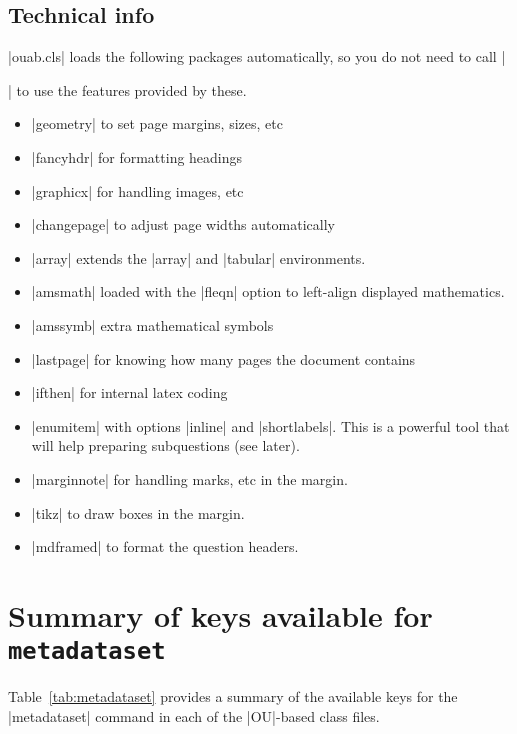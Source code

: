 \documentclass[a4paper]{ltxguide}
\newcommand\3{\unskip\enspace\fbox{\fontsize{4}{4}\selectfont NEW 3.0}}
\begin{document}
\subsection{Technical info}

|ouab.cls| loads the following packages automatically, so you do not need to call |\usepackage{...}| to use the features provided by these.

\begin{itemize}
\item |geometry| to set page margins, sizes, etc
\item |fancyhdr| for formatting headings
\item |graphicx| for handling images, etc
\item |changepage| to adjust page widths automatically
\item |array| extends the |array| and |tabular| environments.
\item |amsmath| loaded with the |fleqn| option to left-align displayed mathematics.
\item |amssymb| extra mathematical symbols
\item |lastpage| for knowing how many pages the document contains
\item |ifthen| for internal latex coding
\item |enumitem| with options |inline| and |shortlabels|. This is a powerful tool that will help preparing subquestions (see later).
\item |marginnote| for handling marks, etc in the margin.
\item |tikz| to draw boxes in the margin.
\item |mdframed| to format the question headers.
\end{itemize}




%
%
%
%
%
%
%
%
%
%

\section{Summary of keys available for \texttt{metadataset}}
Table~\ref{tab:metadataset} provides a summary of the available keys
for the |metadataset| command in each of the |OU|-based class files.
\end{document}
